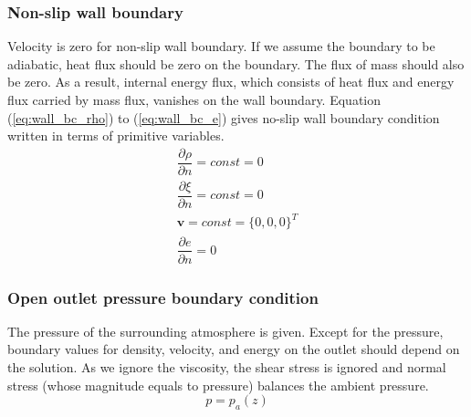 \documentclass[gmd, manuscript]{copernicus}
\begin{document}
\subsubsection{Non-slip wall boundary}
Velocity is zero for non-slip wall boundary. If we assume the boundary to be adiabatic, heat flux should be zero on the boundary. The flux of mass should also be zero. As a result, internal energy flux, which consists of heat flux and energy flux carried by mass flux, vanishes on the wall boundary. Equation (\ref{eq:wall_bc_rho}) to (\ref{eq:wall_bc_e}) gives no-slip wall boundary condition written in terms of primitive variables.
\begin{align}
\dfrac{\partial \rho}{\partial n} = const = 0\label{eq:wall_bc_rho} \\
\dfrac{\partial \xi}{\partial n} = const = 0 \label{eq:wall_bc_xi}\\ 
\textbf{v} = const =\{0,0,0\}^T \label{eq:wall_bc_v}\\
\dfrac{\partial e }{\partial n} = 0\label{eq:wall_bc_e}
\end{align} 

\subsubsection{Open outlet pressure boundary condition}
The pressure of the surrounding atmosphere is given. Except for the pressure, boundary values for density, velocity, and energy on the outlet should depend on the solution. As we ignore the viscosity, the shear stress is ignored and normal stress (whose magnitude equals to pressure) balances the ambient pressure.
\begin{equation}
p = p_a\left(z\right)  \label{eq:pressure_bc_p} 
\end{equation} 
\end{document}
